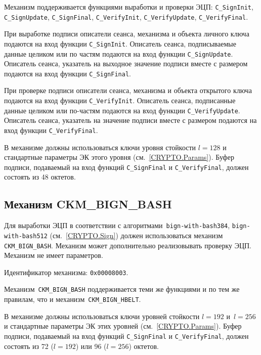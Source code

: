 Механизм поддерживается функциями выработки и проверки ЭЦП: 
\verb|C_SignInit|, \verb|C_SignUpdate|, \verb|C_SignFinal|, 
\verb|C_VerifyInit|, \verb|C_VerifyUpdate|, \verb|C_VerifyFinal|.

При выработке подписи описатели сеанса, механизма и объекта
личного ключа подаются на вход функции \verb|C_SignInit|.
Описатель сеанса, подписываемые данные целиком или по частям подаются
на вход функции \verb|C_SignUpdate|.
Описатель сеанса, указатель на выходное значение подписи вместе с размером
подаются на вход функции \verb|C_SignFinal|.

При проверке подписи описатели сеанса, механизма и объекта
открытого ключа подаются на вход функции \verb|C_VerifyInit|.
Описатель сеанса, подписанные данные целиком или по-частям подаются
на вход функции \verb|C_VerifyUpdate|.
Описатель сеанса, указатель на значение подписи вместе с размером
подаются на вход функции \verb|C_VerifyFinal|.

В механизме должны использоваться ключи уровня стойкости $l=128$ 
и стандартные параметры ЭК этого уровня (см.~\ref{CRYPTO.Params}).
% 
Буфер подписи, подаваемый на вход функций \verb|C_SignFinal| и 
\verb|C_VerifyFinal|, должен состоять из 48 октетов.

\subsection{Механизм CKM\_BIGN\_BASH}\label{CRYPTOKI.SignBash}

Для выработки ЭЦП в соответствии с алгоритмами~\texttt{bign-with-bash384},
\texttt{bign-with-bash512} (см.~\ref{CRYPTO.Sign}) должен использоваться 
механизм \verb|CKM_BIGN_BASH|. Механизм может дополнительно реализовывать 
проверку ЭЦП. 
%
Механизм не имеет параметров.

Идентификатор механизма: \texttt{0x00008003}.

Механизм~\verb|CKM_BIGN_BASH| поддерживается теми же функциями и по тем же 
правилам, что и механизм~\verb|CKM_BIGN_HBELT|.

В механизме должны использоваться ключи уровней стойкости $l=192$ и~$l=256$
и стандартные параметры ЭК этих уровней (см.~\ref{CRYPTO.Params}).
% 
Буфер подписи, подаваемый на вход функций \verb|C_SignFinal| и 
\verb|C_VerifyFinal|, должен состоять из 72 ($l=192$) или 96 ($l=256$) 
октетов. 


